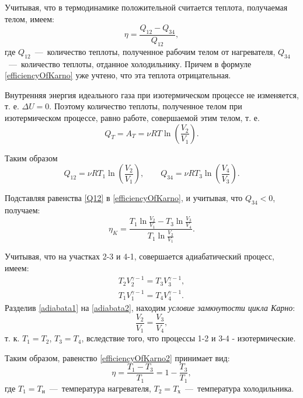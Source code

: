 Учитывая, что в термодинамике положительной считается теплота,
получаемая телом, имеем:
\begin{equation} \label{efficiencyOfKarno}
  \eta = \frac{Q_{12}-Q_{34}}{Q_{12}},
\end{equation}
где $Q_{12}$~---~количество теплоты, полученное рабочим
телом от нагревателя, $Q_{34}$~---~количество теплоты,
отданное холодильнику. Причем в формуле \ref{efficiencyOfKarno} уже учтено, что эта теплота
отрицательная.

Внутренняя энергия идеального газа при изотермическом процессе не
изменяется, т. е. $\Delta U = 0$. Поэтому количество теплоты, полученное
телом при изотермическом процессе, равно работе, совершаемой этим телом,
т. е.
\begin{equation}
  Q_T = A_T = \nu RT\ln{\left (\frac{V_2}{V_1}\right )}.
\end{equation}

Таким образом
\begin{equation} \label{Q12}
  Q_{12} = \nu RT_1\ln{\left (\frac{V_2}{V_1} \right )}, \qquad Q_{34} = \nu RT_3\ln{\left (\frac{V_4}{V_3} \right )}.
\end{equation}

Подставляя равенства \ref{Q12} в \ref{efficiencyOfKarno}, и учитывая, что $Q_{34} < 0$, получаем:
\begin{equation} \label{efficiencyOfKarno2}
  \eta_K = \frac{T_1\ln{\frac{V_2}{V_1}} - T_3\ln{\frac{V_3}{V_4}}}{T_1\ln{\frac{V_2}{V_1}}}.
\end{equation}

Учитывая, что на участках 2-3 и 4-1, совершается адиабатический процесс,
имеем:
\begin{eqnarray}
  T_2V_2^{\gamma -1} = T_3V_3^{\gamma -1}, \label{adiabata1} \\
  T_1V_1^{\gamma -1} = T_4V_4^{\gamma -1}. \label{adiabata2}
\end{eqnarray}
Разделив \ref{adiabata1} на \ref{adiabata2}, находим \emph{условие замкнутости цикла Карно}:
\begin{equation}
  \frac{V_2}{V_1} = \frac{V_3}{V_4},
\end{equation}
т. к. $T_1 = T_2$, $T_3 = T_4$, вследствие того, что процессы 1-2 и 3-4 - изотермические.

Таким образом, равенство \ref{efficiencyOfKarno2} принимает вид:
\begin{equation}
  \eta = \frac{T_1 - T_3}{T_1} = 1- \frac{T_3}{T_1},
\end{equation}
где $T_1 = T_\text{н}$~---~температура нагревателя, $T_2 = T_\text{х}$~---~температура холодильника.

